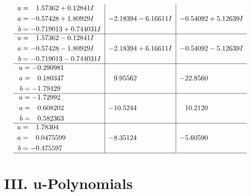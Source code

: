 \documentclass[1p]{elsarticle_modified}
\theoremstyle{definition}
\begin{document}
$$\begin{array}{c|c|c}
\begin{aligned}
u &= \phantom{-}1.57362 + 0.12841 I \\
a &= -0.57428 + 1.80929 I \\
b &= -0.719013 + 0.744031 I\end{aligned}
 & -2.18394 - 6.16611 I & -0.54092 + 5.12639 I \\ \hline\begin{aligned}
u &= \phantom{-}1.57362 - 0.12841 I \\
a &= -0.57428 - 1.80929 I \\
b &= -0.719013 - 0.744031 I\end{aligned}
 & -2.18394 + 6.16611 I & -0.54092 - 5.12639 I \\ \hline\begin{aligned}
u &= -0.290981\phantom{ +0.000000I} \\
a &= \phantom{-}0.180347\phantom{ +0.000000I} \\
b &= -1.79429\phantom{ +0.000000I}\end{aligned}
 & \phantom{-}9.95562\phantom{ +0.000000I} & -22.8560\phantom{ +0.000000I} \\ \hline\begin{aligned}
u &= -1.72992\phantom{ +0.000000I} \\
a &= \phantom{-}0.608202\phantom{ +0.000000I} \\
b &= \phantom{-}0.582363\phantom{ +0.000000I}\end{aligned}
 & -10.5244\phantom{ +0.000000I} & \phantom{-}10.2120\phantom{ +0.000000I} \\ \hline\begin{aligned}
u &= \phantom{-}1.78304\phantom{ +0.000000I} \\
a &= \phantom{-}0.0475599\phantom{ +0.000000I} \\
b &= -0.475597\phantom{ +0.000000I}\end{aligned}
 & -8.35124\phantom{ +0.000000I} & -5.60590\phantom{ +0.000000I}\\
 \hline 
 \end{array}$$\newpage
\newpage\renewcommand{\arraystretch}{1}
\centering \section*{ III. u-Polynomials}
\end{document}
